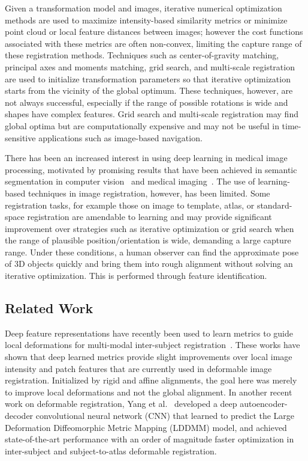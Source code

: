 \documentclass[journal,transmag]{IEEEtran}
\begin{document}
Given a transformation model and images, iterative numerical optimization methods are used to maximize intensity-based similarity metrics or minimize point cloud or local feature distances between images; however the cost functions associated with these metrics are often non-convex, limiting the capture range of these registration methods. Techniques such as center-of-gravity matching, principal axes and moments matching, grid search, and multi-scale registration are used to initialize transformation parameters so that iterative optimization starts from the vicinity of the global optimum. These techniques, however, are not always successful, especially if the range of possible rotations is wide and shapes have complex features. Grid search and multi-scale registration may find global optima but are computationally expensive and may not be useful in time-sensitive applications such as image-based navigation.

There has been an increased interest in using deep learning in medical image processing, motivated by promising results that have been achieved in semantic segmentation in computer vision~\cite{long2015fully} and medical imaging~\cite{greenspan2016guest,litjens2017survey}. The use of learning-based techniques in image registration, however, has been limited. Some registration tasks, for example those on image to template, atlas, or standard-space registration are amendable to learning and may provide significant improvement over strategies such as iterative optimization or grid search when the range of plausible position/orientation is wide, demanding a large capture range. Under these conditions, a human observer can find the approximate pose of 3D objects quickly and bring them into rough alignment without solving an iterative optimization. This is performed through feature identification.

\subsection{Related Work}

Deep feature representations have recently been used to learn metrics to guide local deformations for multi-modal inter-subject registration~\cite{simonovsky2016deep,wu2016scalable}. These works have shown that deep learned metrics provide slight improvements over local image intensity and patch features that are currently used in deformable image registration. Initialized by rigid and affine alignments, the goal here was merely to improve local deformations and not the global alignment. In another recent work on deformable registration, Yang et al.~\cite{yang2017quicksilver} developed a deep autoencoder-decoder convolutional neural network (CNN) that learned to predict the Large Deformation Diffeomorphic Metric Mapping (LDDMM) model, and achieved state-of-the-art performance with an order of magnitude faster optimization in inter-subject and subject-to-atlas deformable registration.
\end{document}
